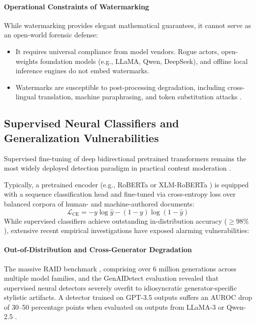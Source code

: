 \paragraph{Operational Constraints of Watermarking}
While watermarking provides elegant mathematical guarantees, it cannot serve as an open-world forensic defense:
\begin{itemize}
    \item It requires universal compliance from model vendors. Rogue actors, open-weights foundation models (e.g., LLaMA, Qwen, DeepSeek), and offline local inference engines do not embed watermarks.
    \item Watermarks are susceptible to post-processing degradation, including cross-lingual translation, machine paraphrasing, and token substitution attacks \citep{sadasivan2023can,chakraborty2023possibilities}.
\end{itemize}

\subsection{Supervised Neural Classifiers and Generalization Vulnerabilities}
Supervised fine-tuning of deep bidirectional pretrained transformers remains the most widely deployed detection paradigm in practical content moderation \citep{solaiman2019release,uchendu2020authorship,ippolito2020automatic}. 

Typically, a pretrained encoder (e.g., RoBERTa \citep{liu2019roberta} or XLM-RoBERTa \citep{conneau2020xlmr}) is equipped with a sequence classification head and fine-tuned via cross-entropy loss over balanced corpora of human- and machine-authored documents:
\begin{equation}
\mathcal{L}_{\text{CE}} = - y \log \hat{y} - (1 - y) \log (1 - \hat{y})
\end{equation}
While supervised classifiers achieve outstanding in-distribution accuracy ($\ge 98\%$), extensive recent empirical investigations have exposed alarming vulnerabilities:

\paragraph{Out-of-Distribution and Cross-Generator Degradation}
The massive RAID benchmark \citep{wang2024raid}, comprising over 6 million generations across multiple model families, and the GenAIDetect evaluation \citep{genaidetection2025} revealed that supervised neural detectors severely overfit to idiosyncratic generator-specific stylistic artifacts. A detector trained on GPT-3.5 outputs suffers an AUROC drop of 30--50 percentage points when evaluated on outputs from LLaMA-3 \citep{touvron2023llama} or Qwen-2.5 \citep{qwen2024}.

